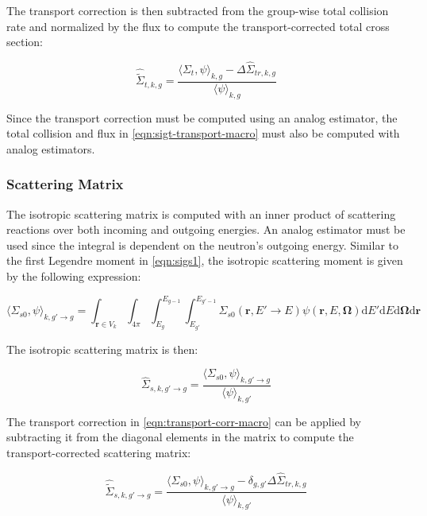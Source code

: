 \noindent The transport correction is then subtracted from the group-wise total collision rate and normalized by the flux to compute the transport-corrected total cross section:

\begin{equation}
\label{eqn:sigt-transport-macro}
\hat{\tilde{\Sigma}}_{t,k,g} = \frac{\langle \Sigma_{t}, \psi \rangle_{k,g} - \Delta\hat{\Sigma}_{tr,k,g}}{\langle \psi \rangle_{k,g}}
\end{equation}

Since the transport correction must be computed using an analog estimator, the total collision and flux in \autoref{eqn:sigt-transport-macro} must also be computed with analog estimators.

\subsubsection{Scattering Matrix}
\label{subsubsec:tally-types-scatt-mat}

The isotropic scattering matrix is computed with an inner product of scattering reactions over both incoming and outgoing energies. An analog estimator must be used since the integral is dependent on the neutron's outgoing energy. Similar to the first Legendre moment in \autoref{eqn:sigs1}, the isotropic scattering moment is given by the following expression:

\begin{equation}
\label{eqn:sigs0}
\langle \Sigma_{s0}, \psi \rangle_{k,g'\rightarrow g} = \int_{\mathbf{r} \in V_{k}} \int_{4\pi} \int_{E_{g}}^{E_{g-1}} \int_{E_{g'}}^{E_{g'-1}} \Sigma_{s0}(\mathbf{r},E'\rightarrow E)\psi(\mathbf{r},E,\mathbf{\Omega}) \mathrm{d}E'\mathrm{d}E\mathrm{d}\mathbf{\Omega}\mathrm{d}\mathbf{r}
\end{equation}

\noindent The isotropic scattering matrix is then:

\begin{equation}
\label{eqn:scatter-macro}
\hat{\Sigma}_{s,k,g'\rightarrow g} = \frac{\langle \Sigma_{s0}, \psi \rangle_{k,g'\rightarrow g}}{\langle \psi \rangle_{k,g'}}
\end{equation}

\noindent The transport correction in \autoref{eqn:transport-corr-macro} can be applied by subtracting it from the diagonal elements in the matrix to compute the transport-corrected scattering matrix:

\begin{equation}
\label{eqn:scatter-trans-macro}
\hat{\tilde{\Sigma}}_{s,k,g'\rightarrow g} = \frac{\langle \Sigma_{s0}, \psi \rangle_{k,g'\rightarrow g} - \delta_{g,g'} \Delta\hat{\Sigma}_{tr,k,g}}{\langle \psi \rangle_{k,g'}}
\end{equation}

